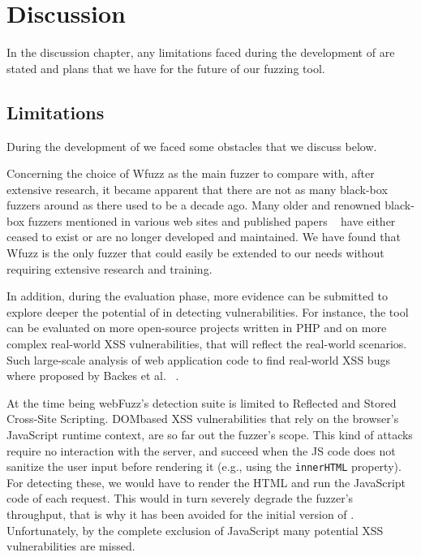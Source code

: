 \chapter{Discussion}
\label{sec:discussion}
\minitoc
\vspace*{1cm}

In the discussion chapter, any limitations faced during the development of \pname{} are stated and plans that we have for the future of our fuzzing tool.

\section{Limitations}
During the development of \pname{} we faced some obstacles that we discuss below.

Concerning the choice of Wfuzz as the main fuzzer to compare \pname{} with, after extensive research, it became apparent that there are not as many black-box fuzzers around as there used to be a decade ago. Many older and renowned black-box fuzzers mentioned in various web sites and published papers ~\cite{doupe2010johnny, bau2010state, duchene2014kameleonfuzz} have either ceased to exist or are no longer developed and maintained. We have found that Wfuzz is the only fuzzer that could easily be extended to our needs without requiring extensive research and training.

In addition, during the evaluation phase, more evidence can be submitted to explore deeper the potential of \pname{} in detecting vulnerabilities. For instance, the tool can be evaluated on more open-source projects written in PHP and on more complex real-world XSS vulnerabilities, that will reflect the real-world scenarios. Such large-scale analysis of web application code to find real-world XSS bugs where proposed by Backes et al. ~\cite{efficient2017}.

At the time being webFuzz’s detection suite is limited to Reflected and Stored Cross-Site Scripting. DOMbased XSS vulnerabilities that rely on the browser's JavaScript runtime context, are so far out the fuzzer's scope. This kind of attacks require no interaction with
the server, and succeed when the JS code does not sanitize the user input before rendering it (e.g., using the {\tt innerHTML} property). For detecting these, we would have to render the HTML and run the JavaScript code of each request. This would in turn severely degrade the fuzzer's throughput, that is why it has been avoided for the initial version of \pname{}.  Unfortunately, by the complete exclusion of JavaScript many potential XSS vulnerabilities are missed.
 
